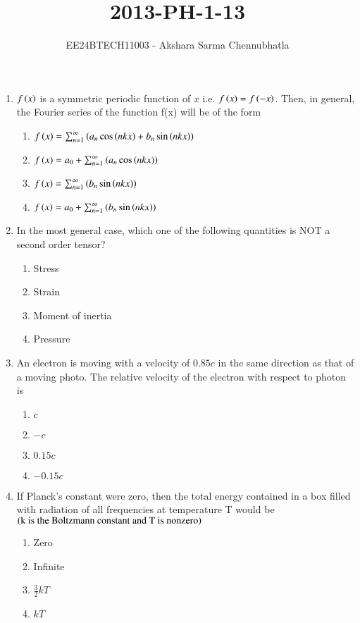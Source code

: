 \documentclass[journal,12pt,onecolumn]{IEEEtran}
\theoremstyle{remark}
\begin{document}

\title{2013-PH-1-13}
\author{EE24BTECH11003 - Akshara Sarma Chennubhatla}
\maketitle
\begin{enumerate}

\item $f\left(x\right)$ is a symmetric periodic function of $x$ i.e. $f\left(x\right) = f\left(-x\right)$. Then, in general, the Fourier series of the function f(x) will be of the form
\hfill{}
\begin{enumerate}
\item $f\left(x\right) = \sum_{n=1}^{\infty} \left(a_n \cos\left(nkx\right) + b_n\sin\left(nkx\right)\right)$
\item $f\left(x\right) = a_0 + \sum_{n=1}^{\infty} \left(a_n \cos\left(nkx\right)\right)$
\item $f\left(x\right) = \sum_{n=1}^{\infty} \left(b_n\sin\left(nkx\right)\right)$
\item $f\left(x\right) = a_0 + \sum_{n=1}^{\infty} \left(b_n\sin\left(nkx\right)\right)$
\end{enumerate}

\item In the most general case, which one of the following quantities is NOT a second order tensor?
\hfill{}
\begin{enumerate}
\item Stress
\item Strain
\item Moment of inertia
\item Pressure
\end{enumerate}

\item An electron is moving with a velocity of $0.85c$ in the same direction as that of a moving photo. The relative velocity of the electron with respect to photon is
\hfill{}
\begin{enumerate}
\item $c$
\item $-c$
\item $0.15c$
\item $-0.15c$
\end{enumerate}

\item If Planck's constant were zero, then the total energy contained in a box filled with radiation of all frequencies at temperature T would be $\left(\text{k is the Boltzmann constant and T is nonzero}\right)$
\hfill{}
\begin{enumerate}
\item Zero
\item Infinite
\item $\frac{3}{2}kT$
\item $kT$
\end{enumerate}


\end{enumerate}
\end{document}
